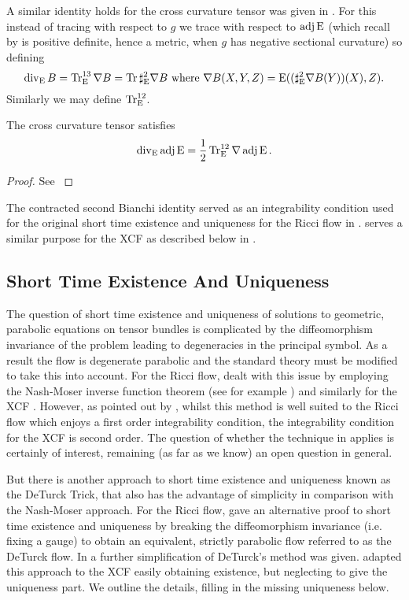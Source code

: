 \documentclass[a4paper, 12pt]{amsart}
\begin{document}
A similar identity holds for the cross curvature tensor was given in \cite[Lemma 1]{MR2055396}. For this instead of tracing with respect to \(g\) we trace with respect to \(\operatorname{adj}\operatorname{E}\) (which recall by  is positive definite, hence a metric, when \(g\) has negative sectional curvature) so defining
\[
\operatorname{div}_{\operatorname{E}} B = \operatorname{Tr}_{\operatorname{E}}^{13} \nabla B = \operatorname{Tr} \sharp_{\operatorname{E}}^2 \nabla B \text{ where } \nabla B(X, Y, Z) = \operatorname{E}((\sharp_{\operatorname{E}}^2 \nabla B (Y)) (X), Z).
\]
Similarly we may define \(\operatorname{Tr}_{\operatorname{E}}^{12}\).
\begin{lemma}
\label{lem:xcf_hamilton_integrability}
The cross curvature tensor satisfies
\[
\operatorname{div}_{\operatorname{E}} \operatorname{adj}\operatorname{E} = \frac{1}{2} \operatorname{Tr}^{12}_{\operatorname{E}} \nabla \operatorname{adj}\operatorname{E}.
\]
\end{lemma}
\begin{proof}
See \cite[Lemma 1]{MR2055396}
\end{proof}
The contracted second Bianchi identity served as an integrability condition used for the original short time existence and uniqueness for the Ricci flow in \cite{Hamilton:/1982}.  serves a similar purpose for the XCF as described below in .

\subsection{Short Time Existence And Uniqueness}
\label{subsec:xcf_existence_uniqueness}

The question of short time existence and uniqueness of solutions to geometric, parabolic equations on tensor bundles is complicated by the diffeomorphism invariance of the problem leading to degeneracies in the principal symbol. As a result the flow is degenerate parabolic and the standard theory must be modified to take this into account. For the Ricci flow, \cite{Hamilton:/1982} dealt with this issue by employing the Nash-Moser inverse function theorem (see for example \cite{MR656198}) and similarly for the XCF \cite{MR2055396}. However, as pointed out by \cite{MR2207496}, whilst this method is well suited to the Ricci flow which enjoys a first order integrability condition, the integrability condition for the XCF is second order. The question of whether the technique in \cite{Hamilton:/1982} applies is certainly of interest, remaining (as far as we know) an open question in general.

But there is another approach to short time existence and uniqueness known as the DeTurck Trick, that also has the advantage of simplicity in comparison with the Nash-Moser approach. For the Ricci flow, \cite{MR697987} gave an alternative proof to short time existence and uniqueness by breaking the diffeomorphism invariance (i.e. fixing a gauge) to obtain an equivalent, strictly parabolic flow referred to as the DeTurck flow. In \cite[Section 6]{MR1375255} a further simplification of DeTurck's method was given. \cite{MR2207496} adapted this approach to the XCF easily obtaining existence, but neglecting to give the uniqueness part. We outline the details, filling in the missing uniqueness below.
\end{document}

